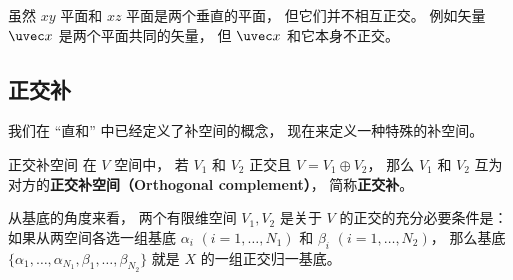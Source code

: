 \begin{example}{}
虽然 $xy$ 平面和 $xz$ 平面是两个垂直的平面， 但它们并不相互正交。 例如矢量 $\uvec x$ 是两个平面共同的矢量， 但 $\uvec x$ 和它本身不正交。
\end{example}

\subsection{正交补}
我们在 “直和” 中已经定义了补空间的概念， 现在来定义一种特殊的补空间。
\begin{definition}{正交补空间}\label{def_OrthSp_1}
在 $V$ 空间中， 若 $V_1$ 和 $V_2$ 正交且 $V = V_1 \oplus V_2$， 那么 $V_1$ 和 $V_2$ 互为对方的\textbf{正交补空间（Orthogonal complement）}， 简称\textbf{正交补}。
\end{definition}

\begin{theorem}{}\label{the_OrthSp_1}
从基底的角度来看， 两个有限维空间 $V_1, V_2$ 是关于 $V$ 的正交的充分必要条件是： 如果从两空间各选一组基底 ${\alpha_i}$ $(i = 1, \dots, N_1)$ 和 ${\beta_i}$ $(i = 1, \dots, N_2)$， 那么基底 $\{\alpha_1, \dots, \alpha_{N_1}, \beta_1, \dots, \beta_{N_2}\}$ 就是 $X$ 的一组正交归一基底。
\end{theorem}

